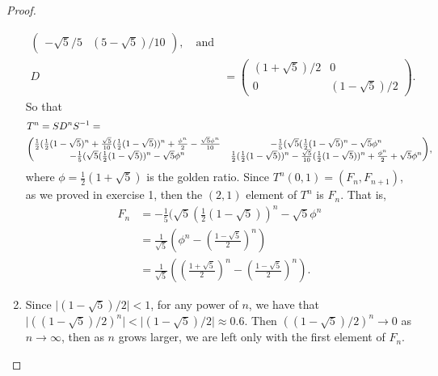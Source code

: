 \begin{proof}
\begin{enumerate}
\begin{align*}
\begin{pmatrix}
        -\sqrt{5}/5 &(5-\sqrt{5})/10
      \end{pmatrix},\quad\text{and}\\
      D&=
      \begin{pmatrix}
        (1+\sqrt{5})/2 & 0\\
        0  & (1-\sqrt{5})/2
      \end{pmatrix}.       
      \end{align*}
      So that 
      \begin{align*}
      \setlength{\arraycolsep}{1pt}
      \renewcommand{\arraystretch}{0.8}
      &T^n=SD^nS^{-1}=\\
      &{\small \begin{pmatrix}
        \frac{1}{2}(\frac{1}{2}(1-\sqrt{5})^n+\frac{\sqrt{5}}{10}(\frac{1}{2}(1-\sqrt{5}))^n + \frac{\phi^n}{2} - \frac{\sqrt{5}\phi^n}{10} & -\frac{1}{5}(\sqrt{5}(\frac{1}{2}(1-\sqrt{5})^n-\sqrt{5}\phi^n \\
        -\frac{1}{5}(\sqrt{5}(\frac{1}{2}(1-\sqrt{5}))^n -\sqrt{5}\phi^n  & \frac{1}{2}(\frac{1}{2}(1-\sqrt{5}))^n - \frac{\sqrt{5}}{10}(\frac{1}{2}(1-\sqrt{5}))^n + \frac{\phi^n}{2} + \sqrt{5}\phi^n 
      \end{pmatrix}},
      \end{align*}
    where $\phi=\frac{1}{2}(1+\sqrt{5})$ is the golden ratio. Since $T^n(0,1)=(F_n,F_{n+1})$, as we proved in exercise 1, then the $(2,1)$ element of $T^n$ is $F_n$. That is, 
    \begin{align*}
        F_n &= -\frac{1}{5}(\sqrt{5}(\frac{1}{2}(1-\sqrt{5}))^n -\sqrt{5}\phi^n\\
        &= \frac{1}{\sqrt{5}}\left(\phi^n-\left(\frac{1-\sqrt{5}}{2}\right)^n\right)\\
        &= \frac{1}{\sqrt{5}}\left(\left(\frac{1+\sqrt{5}}{2}\right)^n-\left(\frac{1-\sqrt{5}}{2}\right)^n\right).
    \end{align*}
      \item Since $\lvert(1-\sqrt{5})/2\rvert< 1$, for any power of $n$, we have that $\lvert((1-\sqrt{5})/2)^n\rvert<\lvert(1-\sqrt{5})/2\rvert\approx 0.6$. Then $((1-\sqrt{5})/2)^n\to 0$ as $n\to \infty$, then as $n$ grows larger, we are left only with the first element of $F_n$.
  \end{enumerate}
\end{proof}